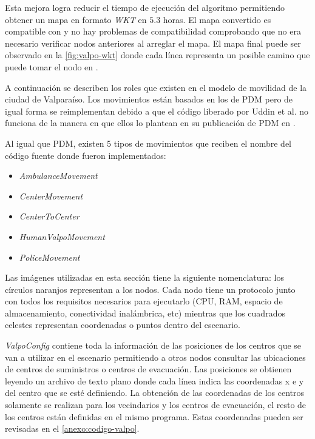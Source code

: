 Esta mejora logra reducir el tiempo de ejecución del algoritmo permitiendo
obtener un mapa en formato \textit{WKT} en $5.3$ horas.  El mapa convertido es
compatible con \theone{} y no hay problemas de compatibilidad comprobando que no
era necesario verificar nodos anteriores al arreglar el mapa. El mapa final
puede ser observado en la \ref{fig:valpo-wkt} donde cada línea representa un
posible camino que puede tomar el nodo en \theone.




A continuación se describen los roles que existen en el modelo de movilidad de
la ciudad de Valparaíso. Los movimientos están basados en los de PDM pero de
igual forma se reimplementan debido a que el código liberado por Uddin et al. no
funciona de la manera en que ellos lo plantean en su publicación de PDM en
\cite{uddin_post-disaster_2009}.


Al igual que PDM, existen 5 tipos de movimientos que reciben el nombre del
código fuente donde fueron implementados:

\begin{itemize}
  \item \textit{AmbulanceMovement}
  \item \textit{CenterMovement}
  \item \textit{CenterToCenter}
  \item \textit{HumanValpoMovement}
  \item \textit{PoliceMovement}
\end{itemize}


Las imágenes utilizadas en esta sección tiene la siguiente nomenclatura: los
círculos naranjos representan a los nodos. Cada nodo tiene un protocolo junto
con todos los requisitos necesarios para ejecutarlo (CPU, RAM, espacio de
almacenamiento, conectividad inalámbrica, etc) mientras que los cuadrados
celestes representan coordenadas o puntos dentro del escenario.




\textit{ValpoConfig} contiene toda la información de las posiciones de los
centros que se van a utilizar en el escenario permitiendo a otros nodos
consultar las ubicaciones de centros de suministros o centros de evacuación. Las
posiciones se obtienen leyendo un archivo de texto plano donde cada línea indica
las coordenadas x e y del centro que se esté definiendo. La obtención de las
coordenadas de los centros solamente se realizan para los vecindarios y los
centros de evacuación, el resto de los centros están definidas en el mismo
programa. Estas coordenadas pueden ser revisadas en el \ref{anexo:codigo-valpo}.

